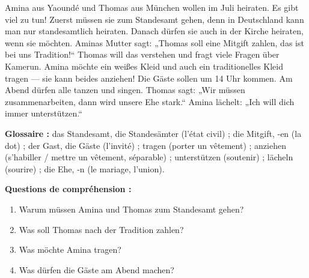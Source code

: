 \documentclass[11pt]{article}
\begin{document}
\begin{textebox}
Amina aus Yaoundé und Thomas aus München wollen im Juli heiraten. Es gibt viel zu tun! Zuerst müssen sie zum Standesamt gehen, denn in Deutschland kann man nur standesamtlich heiraten. Danach dürfen sie auch in der Kirche heiraten, wenn sie möchten. Aminas Mutter sagt: „Thomas soll eine Mitgift zahlen, das ist bei uns Tradition!“ Thomas will das verstehen und fragt viele Fragen über Kamerun. Amina möchte ein weißes Kleid und auch ein traditionelles Kleid tragen — sie kann beides anziehen! Die Gäste sollen um 14 Uhr kommen. Am Abend dürfen alle tanzen und singen. Thomas sagt: „Wir müssen zusammenarbeiten, dann wird unsere Ehe stark.“ Amina lächelt: „Ich will dich immer unterstützen.“

\medskip

\textbf{Glossaire :} das Standesamt, die Standesämter (l'état civil) ; die Mitgift, -en (la dot) ; der Gast, die Gäste (l'invité) ; tragen (porter un vêtement) ; anziehen (s'habiller / mettre un vêtement, séparable) ; unterstützen (soutenir) ; lächeln (sourire) ; die Ehe, -n (le mariage, l'union).

\medskip

\textbf{Questions de compréhension :}
\begin{enumerate}
\item Warum müssen Amina und Thomas zum Standesamt gehen?
\item Was soll Thomas nach der Tradition zahlen?
\item Was möchte Amina tragen?
\item Was dürfen die Gäste am Abend machen?
\end{enumerate}
\end{textebox}
\end{document}

